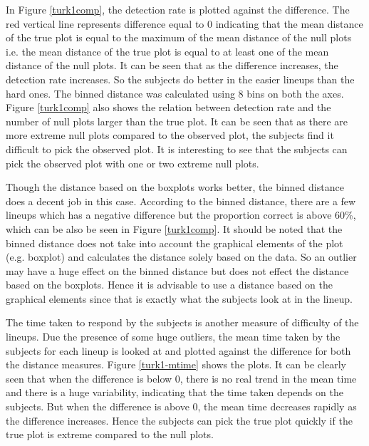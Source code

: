 \documentclass[12]{article}
\begin{document}
In Figure \ref{turk1comp}, the detection rate is plotted against the difference. The red vertical line represents difference equal to 0 indicating that the mean distance of the true plot is equal to the maximum of the mean distance of the null plots i.e. the mean distance of the true plot is equal to at least one of the mean distance of the null plots. It can be seen that as the difference increases, the detection rate increases. So the subjects do better in the easier lineups than the hard ones. The binned distance was calculated using 8 bins on both the axes. Figure \ref{turk1comp} also shows the relation between detection rate and the number of null plots larger than the true plot. It can be seen that as there are more extreme null plots compared to the observed plot, the subjects find it difficult to pick the observed plot. It is interesting to see that the subjects can pick the observed plot with one or two extreme null plots. 

Though the distance based on the boxplots works better, the binned distance does a decent job in this case. According to the binned distance, there are a few lineups which has a negative difference but the proportion correct is above 60\%, which can be also be seen in Figure \ref{turk1comp}. It should be noted that the binned distance does not take into account the graphical elements of the plot (e.g. boxplot) and calculates the distance solely based on the data. So an outlier may have a huge effect on the binned distance but does not effect the distance based on the boxplots. Hence it is advisable to use a distance based on the graphical elements since that is exactly what the subjects look at in the lineup.

The time taken to respond by the subjects is another measure of difficulty of the lineups. Due the presence of some huge outliers, the mean time taken by the subjects for each lineup is looked at and plotted against the difference for both the distance measures. Figure \ref{turk1-mtime} shows the plots. It can be clearly seen that when the difference is below 0, there is no real trend in the mean time and there is a huge variability, indicating that the time taken depends on the subjects. But when the difference is above 0, the mean time decreases rapidly as the difference increases. Hence the subjects can pick the true plot quickly if the true plot is extreme compared to the null plots.
 
\end{document}
